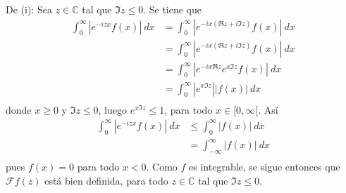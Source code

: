 \documentclass[12pt]{report}
\newcounter{it}
\theoremstyle{largebreak}
\renewcommand{\leq}{\ensuremath{\leqslant}}
\renewcommand{\geq}{\ensuremath{\geqslant}}
\newcommand\abs[1]{\ensuremath{\left|#1\right|}}
\newcommand{\fou}[1]{\ensuremath{\mathcal{F}#1}}
\begin{document}
    \begin{sol}
        De (i): Sea $z\in\mathbb{C}$ tal que $\Im z\leq0$. Se tiene que
        \begin{equation*}
            \begin{split}
                \int_0^{\infty}\abs{e^{ -izx}f(x)}\:dx&=\int_0^{\infty}\abs{e^{ -ix(\Re z+i\Im z)}f(x)}\:dx\\
                &=\int_0^{\infty}\abs{e^{ -ix(\Re z+i\Im z)}f(x)}\:dx\\
                &=\int_0^{\infty}\abs{e^{ -ix\Re z}e^{ x\Im z}f(x)}\:dx\\
                &=\int_0^{\infty}\abs{e^{x\Im z}}\abs{f(x)}\:dx\\
            \end{split}
        \end{equation*}
        donde $x\geq 0$ y $\Im z\leq0$, luego $e^{x\Im z}\leq1$, para todo $x\in [0,\infty[$. Así
        \begin{equation*}
            \begin{split}
                \int_0^{\infty}\abs{e^{ -izx}f(x)}\:dx&\leq\int_0^{\infty}\abs{f(x)}\:dx\\
                &=\int_{-\infty}^\infty\abs{f(x)}\:dx\\
            \end{split}
        \end{equation*}
        pues $f(x)=0$ para todo $x<0$. Como $f$ es integrable, se sigue entonces que $\fou{f}(z)$ está bien definida, para todo $z\in\mathbb{C}$ tal que $\Im z\leq0$.


\end{sol}
\end{document}
